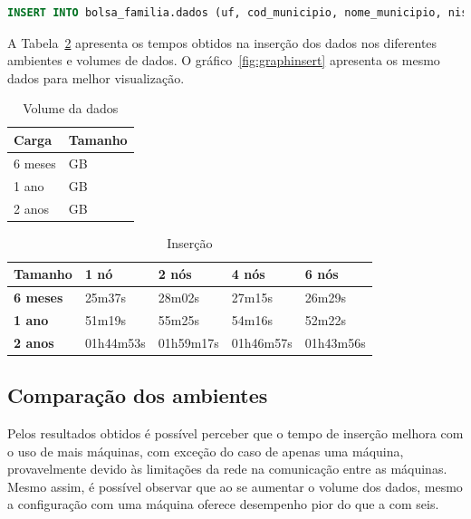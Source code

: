 \begin{lstlisting}[caption={Código CQL para inserção},label={lst:label},language=SQL]
INSERT INTO bolsa_familia.dados (uf, cod_municipio, nome_municipio, nis_favorecido, nome_favorecido, fonte, valor, periodo) VALUES (?, ?, ?, ?, ?, ?, ?, ?)
\end{lstlisting}

A Tabela~\ref{tb_insert} apresenta os tempos obtidos na inserção dos dados nos diferentes ambientes e volumes de dados. O gráfico~\ref{fig:graphinsert} apresenta os mesmo dados para melhor visualização.

\begin{table}[]
	\centering
	\caption{Volume da dados}
	\label{tab:volume}
	\begin{tabular}{ll}
		\textbf{Carga} & \textbf{Tamanho} \\ \hline
		6 meses        &  GB             \\ \hline
		1 ano          &  GB             \\ \hline
		2 anos         &  GB             \\ \hline
	\end{tabular}
\end{table}

\begin{table}[]
	\centering
	\caption{Inserção}
	\label{tb_insert}
	\begin{tabular}{lllll}
		\textbf{Tamanho}	& \textbf{1 nó} & \textbf{2 nós} & \textbf{4 nós} & \textbf{6 nós} \\ \hline
		\textbf{6 meses}    & 25m37s        & 28m02s         & 27m15s         & 26m29s         \\ \hline
		\textbf{1 ano}      & 51m19s        & 55m25s         & 54m16s         & 52m22s         \\ \hline
		\textbf{2 anos}     & 01h44m53s     & 01h59m17s      & 01h46m57s      & 01h43m56s      \\ \hline
	\end{tabular}
\end{table}

\subsection{Comparação dos ambientes}

Pelos resultados obtidos é possível perceber que o tempo de inserção melhora com o uso de mais máquinas, com exceção do caso de apenas uma máquina, provavelmente devido às limitações da rede na comunicação entre as máquinas. Mesmo assim, é possível observar que ao se aumentar o volume dos dados, mesmo a configuração com uma máquina oferece desempenho pior do que a com seis. 

